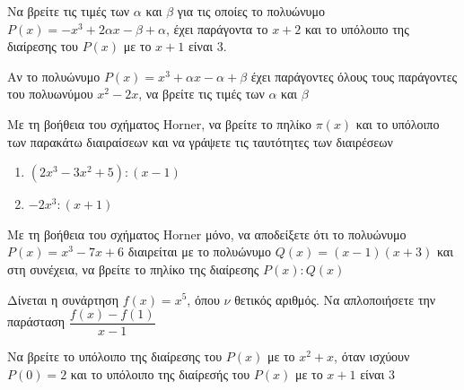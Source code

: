\documentclass{presentation}
\begin{document}
\begin{askisi}
  Να βρείτε τις τιμές των $α$ και $β$ για τις οποίες το πολυώνυμο $P(x)=-x^3+2αx-β+α$, έχει παράγοντα το $x+2$ και το υπόλοιπο της διαίρεσης του $P(x)$ με το $x+1$ είναι 3.


\end{askisi}

\begin{askisi}
  Αν το πολυώνυμο $P(x)=x^3+αx-α+β$ έχει παράγοντες όλους τους παράγοντες του πολυωνύμου $x^2-2x$, να βρείτε τις τιμές των $α$ και $β$


\end{askisi}

\begin{askisi}
  Με τη βοήθεια του σχήματος Horner, να βρείτε το πηλίκο $π(x)$ και το υπόλοιπο των παρακάτω διαιραίσεων και να γράψετε τις ταυτότητες των διαιρέσεων
  \begin{enumerate}
    \item<1-> $(2x^3-3x^2+5):(x-1)$
    \item<2-> $-2x^3:(x+1)$
  \end{enumerate}


\end{askisi}

\begin{askisi}
  Με τη βοήθεια του σχήματος Horner μόνο, να αποδείξετε ότι το πολυώνυμο $P(x)=x^3-7x+6$ διαιρείται με το πολυώνυμο $Q(x)=(x-1)(x+3)$ και στη συνέχεια, να βρείτε το πηλίκο της διαίρεσης $P(x):Q(x)$


\end{askisi}

\begin{askisi}
  Δίνεται η συνάρτηση $f(x)=x^5$, όπου $ν$ θετικός αριθμός. Να απλοποιήσετε την παράσταση $\dfrac{f(x)-f(1)}{x-1}$


\end{askisi}

\begin{askisi}
  Να βρείτε το υπόλοιπο της διαίρεσης του $P(x)$ με το $x^2+x$, όταν ισχύουν $P(0)=2$ και το υπόλοιπο της διαίρεσής του $P(x)$ με το $x+1$ είναι $3$


\end{askisi}
\end{document}
